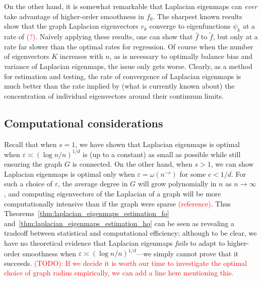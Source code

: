 \documentclass{article}
\newcommand{\1}{\mathbf{1}}
\newcommand{\wt}[1]{\widetilde{#1}}
\newcommand{\wh}[1]{\widehat{#1}}
\theoremstyle{alden}
\theoremstyle{aldenthm}
\theoremstyle{definition}
\theoremstyle{remark}
\begin{document}
On the other hand, it is somewhat remarkable that Laplacian eigenmaps can \emph{ever} take advantage of higher-order smoothness in $f_0$. The sharpest known results show that the graph Laplacian eigenvectors $v_k$ converge to eigenfunctions $\psi_k$ at a rate of \textcolor{red}{(?)}. Naively applying these results, one can show that $\wh{f}$ to $\wt{f}$, but only at a rate far slower than the optimal rates for regression. Of course when the number of eigenvectors $K$ increases with $n$, as is necessary to optimally balance bias and variance of Laplacian eigenmaps, the issue only gets worse. Clearly, as a method for estimation and testing, the rate of convergence of Laplacian eigenmaps is much better than the rate implied by (what is currently known about) the concentration of individual eigenvectors around their continuum limits.

\subsection{Computational considerations}
Recall that when $s = 1$, we have shown that Laplacian eigenmaps is optimal when $\varepsilon \asymp (\log n/n)^{1/d}$ is (up to a constant) as small as possible while still ensuring the graph $G$ is connected. On the other hand, when $s > 1$, we can show Laplacian eigenmaps is optimal only when $\varepsilon = \omega(n^{-c})$ for some $c < 1/d$. For such a choice of $\varepsilon$, the average degree in $G$ will grow polynomially in $n$ as $n \to \infty$, and computing eigenvectors of the Laplacian of a graph will be more computationally intensive than if the graph were sparse \textcolor{red}{(reference)}. Thus Theorems~\ref{thm:laplacian_eigenmaps_estimation_fo} and~\ref{thm:laplacian_eigenmaps_estimation_ho} can be seen as revealing a tradeoff between statistical and computational efficiency; although to be clear, we have no theoretical evidence that Laplacian eigenmaps \emph{fails} to adapt to higher-order smoothness when $\varepsilon \asymp (\log n/n)^{1/d}$---we simply cannot prove that it succeeds. 
\textcolor{red}{(TODO): If we decide it is worth our time to investigate the optimal choice of graph radius empirically, we can add a line here mentioning this.}
\end{document}
